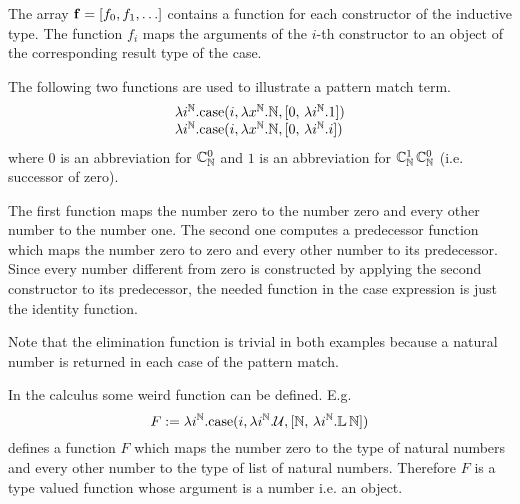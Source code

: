 \begin{description}
  The array $\mathbf{f} = [f_0, f_1, \ldots]$ contains a function for each
  constructor of the inductive type. The function $f_i$ maps the arguments of
  the $i$-th constructor to an object of the corresponding result type of the
  case.

  The following two functions are used to illustrate a pattern match term.
  {\def\Nat{\mathbb{N}}
    $$
    \begin{array}{l}
      \lambda i^\Nat.
      \case(i, \lambda x^\Nat. \Nat, [0,\, \lambda i^\Nat. 1])

      \\

      \lambda i^\Nat.
      \case(i, \lambda x^\Nat. \Nat, [0,\, \lambda i^\Nat. i])

    \end{array}
    $$
    where $0$ is an abbreviation for $\Constructor^0_\Nat$ and $1$ is an
    abbreviation for $\Constructor^1_\Nat\, \Constructor^0_\Nat$
    (i.e. successor of zero).
  }

  The first function maps the number zero to the number zero and every other
  number to the number one. The second one computes a predecessor function
  which maps the number zero to zero and every other number to its
  predecessor. Since every number different from zero is constructed by
  applying the second constructor to its predecessor, the needed function in
  the case expression is just the identity function.

  Note that the elimination function is trivial in both examples because a
  natural number is returned in each case of the pattern match.

  {\def\Nat{\mathbb{N}} \def\List{\mathbb{L}}

    In the calculus some weird function can be defined. E.g.
    $$
    F :=
    \lambda i^\Nat.
    \case(i, \lambda i^\Nat. \Any, [\Nat,\, \lambda i^\Nat. \List\, \Nat])
    $$
    defines a function $F$ which maps the number zero to the type of natural
    numbers and every other number to the type of list of natural
    numbers. Therefore $F$ is a type valued function whose argument is a
    number i.e. an object.

}
\end{description}
